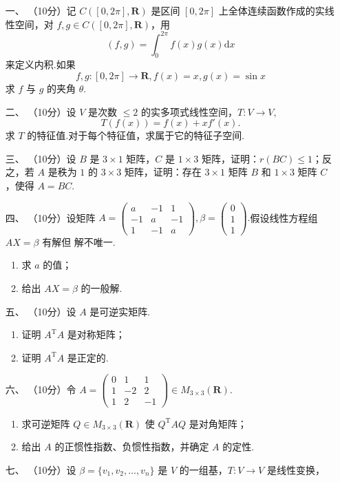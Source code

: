 \begin{enumerate}

    \item [一、]（10分）记 $C([0,2\pi],\mathbf{R})$ 是区间 $[0,2\pi]$ 上全体连续函数作成的实线性空间，对 $f,g \in C([0,2\pi],\mathbf{R})$，用 
    \[(f,g) = \displaystyle\int_0^{2\pi}f(x)g(x)\mathrm{d}x\]
    来定义内积.如果
    \[f,g:[0,2\pi] \to \mathbf{R},f(x)=x,g(x)=\sin x\]
    求 $f$ 与 $g$ 的夹角 $\theta.$
    \item[二、]（10分）设 $V$ 是次数 $\leq 2$ 的实多项式线性空间，$T:V\to V,$
    \[T(f(x)) = f(x) + xf'(x).\]
    求 $T$ 的特征值.对于每个特征值，求属于它的特征子空间.
    \item[三、]（10分）设 $B$ 是 $3\times 1$ 矩阵，$C$ 是 $1\times 3$ 矩阵，证明：$r(BC)\leq 1$；反之，若 $A$ 是秩为 $1$ 
    的 $3\times 3$ 矩阵，证明：存在 $3\times 1$ 矩阵 $B$ 和 $1\times 3$ 矩阵 $C$，使得 $A=BC.$ 
    \item[四、]（10分）设矩阵 $A=\begin{pmatrix}a & -1 & 1 \\ -1 & a & -1 \\ 1 & -1 & a\end{pmatrix},\beta =\begin{pmatrix}0 \\ 1 \\ 1\end{pmatrix}.$假设线性方程组 $AX=\beta$ 有解但
    解不唯一.
    \begin{enumerate}[label=(\arabic*)]
        \item 求 $a$ 的值；
        \item 给出 $AX=\beta$ 的一般解.
    \end{enumerate}
    \item[五、]（10分）设 $A$ 是可逆实矩阵.
    \begin{enumerate}[label=(\arabic*)]
        \item 证明 $A^{\mathrm{T}}A$ 是对称矩阵；
        \item 证明 $A^{\mathrm{T}}A$ 是正定的.
    \end{enumerate}
    \item[六、]（10分）令 $A = \begin{pmatrix}0 & 1 & 1 \\ 1 & -2 & 2 \\ 1 & 2 & -1 \end{pmatrix} \in M_{3\times 3}(\mathbf R).$
    \begin{enumerate}[label=(\arabic*)]
        \item 求可逆矩阵 $Q\in M_{3\times 3}(\mathbf R)$ 使 $Q^{\mathrm{T}}AQ$ 是对角矩阵；
        \item 给出 $A$ 的正惯性指数、负惯性指数，并确定 $A$ 的定性.
    \end{enumerate}
    \item[七、]（10分）设 $\beta=\{v_1,v_2,\ldots,v_n\}$ 是 $V$ 的一组基，$T:V\to V$ 是线性变换，
    

\end{enumerate}

